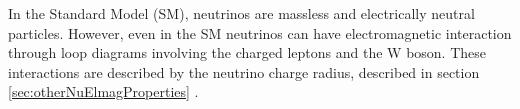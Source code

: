 


In the Standard Model (SM), neutrinos are massless and electrically neutral particles. However, even in the SM neutrinos can have electromagnetic interaction through loop diagrams involving the charged leptons and the W boson. These interactions are described by the neutrino charge radius, described in section \ref{sec:otherNuElmagProperties} \cite{NeutrinoPropertiesSnowmass2022.pdf}.


